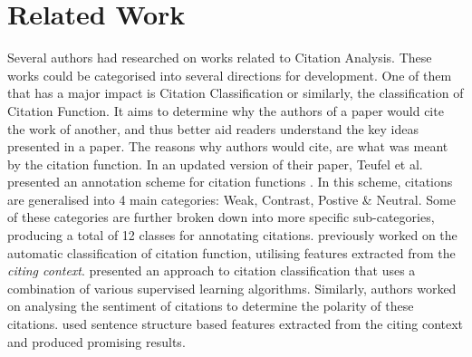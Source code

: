 \chapter{Related Work}
\label{Related Works}

Several authors had researched on works related to Citation Analysis. These works could be categorised into several directions for development. One of them that has a major impact is Citation Classification or similarly, the classification of Citation Function. It aims to determine why the authors of a paper would cite the work of another, and thus better aid readers understand the key ideas presented in a paper. The reasons why authors would cite, are what was meant by the citation function. In an updated version of their paper, Teufel et al. presented an annotation scheme for citation functions \cite{teufel2009annotation}. In this scheme, citations are generalised into 4 main categories: Weak, Contrast, Postive \& Neutral. Some of these categories are further broken down into more specific sub-categories, producing a total of 12 classes for annotating citations. \cite{teufel2006automatic} previously worked on the automatic classification of citation function, utilising features extracted from the \textit{citing context}. \cite{dongensemble} presented an approach to citation classification that uses a combination of various supervised learning algorithms. Similarly, authors worked on analysing the sentiment of citations to determine the polarity of these citations. \cite{athar2011sentiment} used sentence structure based features extracted from the citing context and produced promising results.

